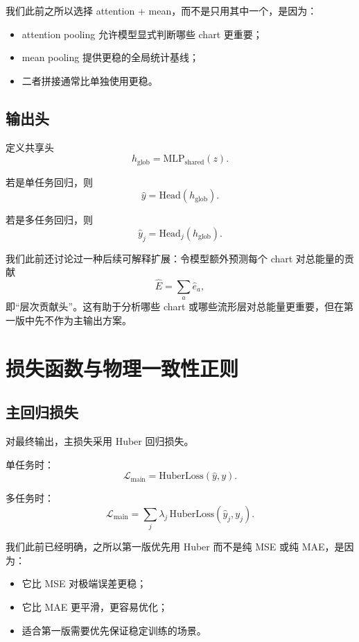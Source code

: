 \documentclass[12pt,a4paper]{ctexart}
\begin{document}
我们此前之所以选择 attention + mean，而不是只用其中一个，是因为：
\begin{itemize}[leftmargin=2em]
    \item attention pooling 允许模型显式判断哪些 chart 更重要；
    \item mean pooling 提供更稳的全局统计基线；
    \item 二者拼接通常比单独使用更稳。
\end{itemize}

\subsection{输出头}

定义共享头
\[
h_{\mathrm{glob}}
=
\mathrm{MLP}_{\mathrm{shared}}(z).
\]

若是单任务回归，则
\[
\hat y=\mathrm{Head}(h_{\mathrm{glob}}).
\]

若是多任务回归，则
\[
\hat y_j=\mathrm{Head}_j(h_{\mathrm{glob}}).
\]

我们此前还讨论过一种后续可解释扩展：令模型额外预测每个 chart 对总能量的贡献
\[
\hat E=\sum_a \hat e_a,
\]
即“层次贡献头”。这有助于分析哪些 chart 或哪些流形层对总能量更重要，但在第一版中先不作为主输出方案。

\section{损失函数与物理一致性正则}

\subsection{主回归损失}

对最终输出，主损失采用 Huber 回归损失。

单任务时：
\[
\mathcal L_{\mathrm{main}}
=
\mathrm{HuberLoss}(\hat y,y).
\]

多任务时：
\[
\mathcal L_{\mathrm{main}}
=
\sum_j
\lambda_j\,
\mathrm{HuberLoss}(\hat y_j,y_j).
\]

我们此前已经明确，之所以第一版优先用 Huber 而不是纯 MSE 或纯 MAE，是因为：
\begin{itemize}[leftmargin=2em]
    \item 它比 MSE 对极端误差更稳；
    \item 它比 MAE 更平滑，更容易优化；
    \item 适合第一版需要优先保证稳定训练的场景。
\end{itemize}
\end{document}
